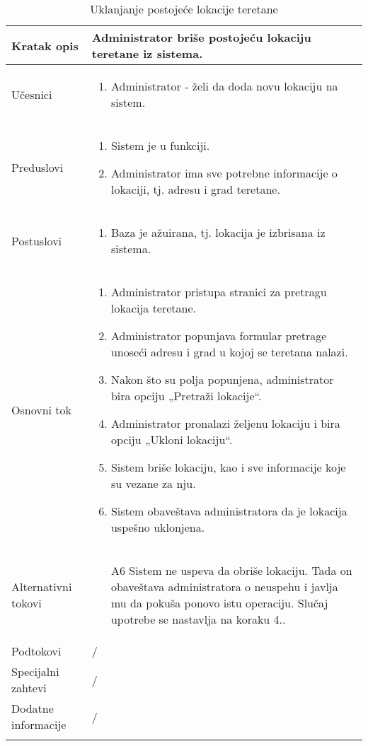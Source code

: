\documentclass[../main.tex]{subfiles}
\begin{document}
\begin{longtable}{| p{} | p{} |} 

\hline
    Kratak opis &  Administrator briše postojeću lokaciju teretane iz sistema.\\ 
\hline    
    Učesnici & 
    	\begin{enumerate}
        \item Administrator - želi da doda novu lokaciju na sistem.
     \end{enumerate}\\
\hline
   Preduslovi & \begin{enumerate}
       \item Sistem je u funkciji.
       \item Administrator ima sve potrebne informacije o lokaciji, tj. adresu i grad teretane.
   \end{enumerate}\\
\hline  
    Postuslovi & \begin{enumerate}
        \item Baza je ažuirana, tj. lokacija je izbrisana iz sistema.
    \end{enumerate}\\
\hline
    Osnovni tok & \begin{enumerate}
        \item Administrator pristupa stranici za pretragu lokacija teretane.
        \item Administrator popunjava formular pretrage unoseći adresu i grad u kojoj se teretana nalazi.
        \item Nakon što su polja popunjena, administrator bira opciju „Pretraži lokacije“.
        \item Administrator pronalazi željenu lokaciju i bira opciju „Ukloni lokaciju“.
        \item Sistem briše lokaciju, kao i sve informacije koje su vezane za nju.
        \item Sistem obaveštava administratora da je lokacija uspešno uklonjena.
    \end{enumerate}\\
\hline
    Alternativni tokovi & \begin{itemize}
        \item[A6]  Sistem ne uspeva da obriše lokaciju. Tada on obaveštava administratora o neuspehu i javlja mu da pokuša ponovo istu operaciju. Slučaj upotrebe se nastavlja na koraku 4..

    \end{itemize}\\
\hline
    Podtokovi & /\\
\hline
    Specijalni zahtevi & /\\
\hline
    Dodatne informacije & /\\
\hline
\caption{Uklanjanje postojeće lokacije teretane} %
\end{longtable}
\end{document}
